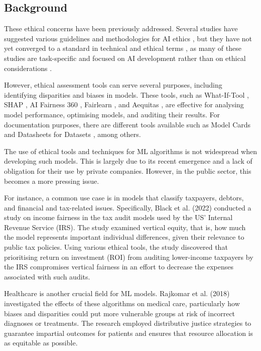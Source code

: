 \documentclass[twoside,11pt]{article}
\begin{document}
\subsection{Background}

These ethical concerns have been previously addressed. Several studies have suggested various guidelines and methodologies for AI ethics ,  but they have not yet converged to a standard in technical and ethical terms ,  as many of these studies are task-specific and focused on AI development rather than on ethical considerations .

However, ethical assessment tools can serve several purposes, including identifying disparities and biases in models. These tools, such as What-If-Tool , SHAP , AI Fairness 360 , Fairlearn , and Aequitas , are effective for analysing model performance, optimising models, and auditing their results. For documentation purposes, there are different tools available such as Model Cards  and Datasheets for Datasets , among others. 

The use of ethical tools and techniques for ML algorithms is not widespread when developing such models. This is largely due to its recent emergence and a lack of obligation for their use by private companies. However, in the public sector, this becomes a more pressing issue.

For instance, a common use case is in models that classify taxpayers, debtors, and financial and tax-related issues. Specifically, Black et al. (2022)  conducted a study on income fairness in the tax audit models used by the US' Internal Revenue Service (IRS). The study examined vertical equity, that is, how much the model represents important individual differences, given their relevance to public tax policies. Using various ethical tools, the study discovered that prioritising return on investment (ROI) from auditing lower-income taxpayers by the IRS compromises vertical fairness in an effort to decrease the expenses associated with such audits.

Healthcare is another crucial field for ML models. Rajkomar et al. (2018)  investigated the effects of these algorithms on medical care, particularly how biases and disparities could put more vulnerable groups at risk of incorrect diagnoses or treatments. The research employed distributive justice strategies to guarantee impartial outcomes for patients and ensures that resource allocation is as equitable as possible.
\end{document}
